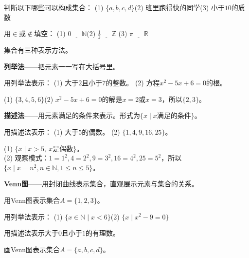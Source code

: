 \begin{exercise}
\item 判断以下哪些可以构成集合：
(1) $\{a,b,c,d\}$\quad (2) 班里跑得快的同学\quad (3) 小于$10$的质数
\item 用$\in$或$\notin$填空：
(1) $0\;\underline{\quad}\;\mathbb N$\quad (2) $\frac12\;\underline{\quad}\;\mathbb Z$\quad
(3) $\pi\;\underline{\quad}\;\mathbb R$
\end{exercise}


集合有三种表示方法。

\textbf{列举法}——把元素一一写在大括号里。

\begin{example}
用列举法表示：
(1) 大于$2$且小于$7$的整数。
(2) 方程$x^2-5x+6=0$的根。
\end{example}
\begin{solution}
(1) $\{3,4,5,6\}$\qquad (2) $x^2-5x+6=0$的解是$x=2$或$x=3$，所以$\{2,3\}$。
\end{solution}

\textbf{描述法}——用元素满足的条件来表示。形式为$\{x\mid x\text{满足的条件}\}$。

\begin{example}
用描述法表示：
(1) 大于$5$的偶数。
(2) $\{1,4,9,16,25\}$。
\end{example}
\begin{solution}
(1) $\{x\mid x>5,\ x\text{是偶数}\}$。\\
(2) 观察模式：$1=1^2,4=2^2,9=3^2,16=4^2,25=5^2$，所以$\{x\mid x=n^2,n\in\mathbb N,1\le n\le5\}$。
\end{solution}

\textbf{Venn图}——用封闭曲线表示集合，直观展示元素与集合的关系。

\begin{example}
用Venn图表示集合$A=\{1,2,3\}$。
\end{example}
\begin{solution}
\begin{center}
\end{center}
\end{solution}

\begin{exercise}
\item 用列举法表示：
(1) $\{x\in\mathbb N\mid x<6\}$\quad (2) $\{x\mid x^2-9=0\}$
\item 用描述法表示大于$0$且小于$1$的有理数。
\item 画Venn图表示集合$A=\{a,b,c,d\}$。
\end{exercise}

